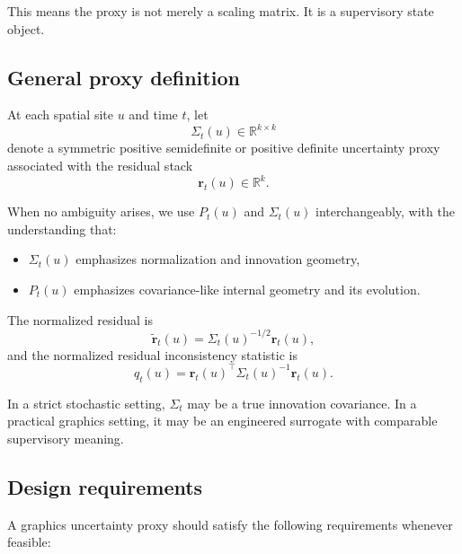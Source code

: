 \documentclass[11pt,letterpaper]{article}
\theoremstyle{gcresult}
\theoremstyle{definition}
\begin{document}
This means the proxy is not merely a scaling matrix. It is a supervisory state object.


\subsection{General proxy definition}

At each spatial site $u$ and time $t$, let
\begin{equation}
\Sigma_t(u)\in\mathbb{R}^{k\times k}
\end{equation}
denote a symmetric positive semidefinite or positive definite uncertainty proxy associated with the residual stack
\begin{equation}
\mathbf r_t(u)\in\mathbb{R}^k.
\end{equation}

When no ambiguity arises, we use $P_t(u)$ and $\Sigma_t(u)$ interchangeably, with the understanding that:
\begin{itemize}[leftmargin=1.5em]
    \item $\Sigma_t(u)$ emphasizes normalization and innovation geometry,
    \item $P_t(u)$ emphasizes covariance-like internal geometry and its evolution.
\end{itemize}

The normalized residual is
\begin{equation}
\tilde{\mathbf r}_t(u)=\Sigma_t(u)^{-1/2}\mathbf r_t(u),
\end{equation}
and the normalized residual inconsistency statistic is
\begin{equation}
q_t(u)=\mathbf r_t(u)^\top \Sigma_t(u)^{-1}\mathbf r_t(u).
\end{equation}

In a strict stochastic setting, $\Sigma_t$ may be a true innovation covariance. In a practical graphics setting, it may be an engineered surrogate with comparable supervisory meaning.


\subsection{Design requirements}

A graphics uncertainty proxy should satisfy the following requirements whenever feasible:
\end{document}
